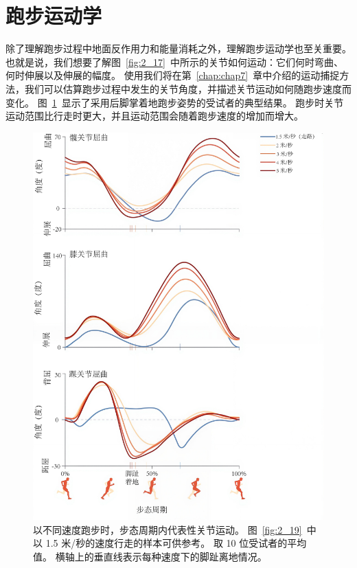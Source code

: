 \section{跑步运动学}

除了理解跑步过程中地面反作用力和能量消耗之外，理解跑步运动学也至关重要。
也就是说，我们想要了解图~\ref{fig:2_17}~中所示的关节如何运动：它们何时弯曲、何时伸展以及伸展的幅度。
使用我们将在第~\ref{chap:chap7}~章中介绍的运动捕捉方法，我们可以估算跑步过程中发生的关节角度，并描述关节运动如何随跑步速度而变化。
图~\ref{fig:3_20}~显示了采用后脚掌着地跑步姿势的受试者的典型结果。
跑步时关节运动范围比行走时更大，并且运动范围会随着跑步速度的增加而增大。


\begin{figure}[!htb]
	\centering
	\includegraphics[width=1.0\linewidth]{chap3/3_20}
	\caption{以不同速度跑步时，步态周期内代表性关节运动。
		图~\ref{fig:2_19}~中以 1.5 米/秒的速度行走的样本可供参考。
		取 10 位受试者的平均值。
		横轴上的垂直线表示每种速度下的脚趾离地情况\cite{hamner2013muscle}。 \label{fig:3_20}}
\end{figure}


